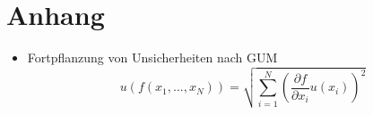 \documentclass[
	a4paper,
	12pt,
	pagesize,
	ngerman
]{scrartcl}
\begin{document}
	
	\printbibliography
	
	\section{Anhang}
	\begin{itemize}
	\item Fortpflanzung von Unsicherheiten nach GUM
	\begin{equation}
		u(f(x_1,...,x_N)) = \sqrt{\sum_{i=1}^{N}\left(\frac{\partial{f}}{\partial{x_i}}u(x_i)\right)^2}
		\label{GUM}
	\end{equation}
	
	 \end{itemize}
\end{document}

